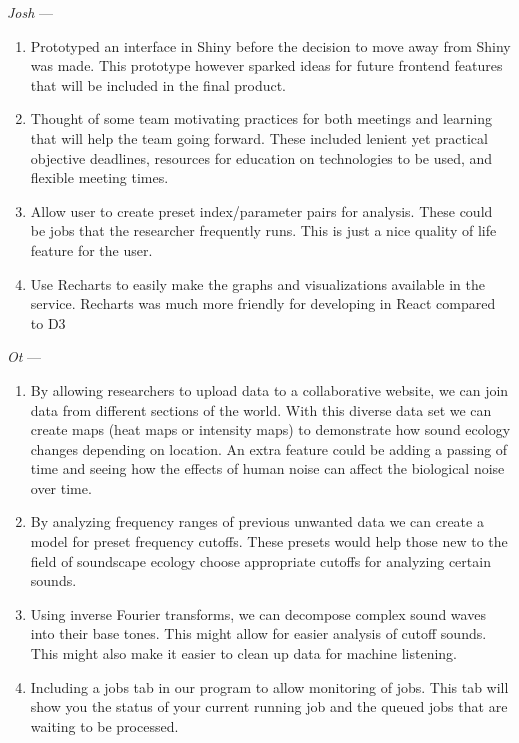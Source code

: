 \textit{Josh} ---
\begin{enumerate}
    \item Prototyped an interface in Shiny before the decision to move away from Shiny was made. This prototype however sparked ideas for future frontend features that will be included in the final product.
    \item Thought of some team motivating practices for both meetings and learning that will help the team going forward. These included lenient yet practical objective deadlines, resources for education on technologies to be used, and flexible meeting times.
    \item Allow user to create preset index/parameter pairs for analysis. These could be jobs that the researcher frequently runs. This is just a nice quality of life feature for the user.
    \item Use Recharts to easily make the graphs and visualizations available in the service. Recharts was much more friendly for developing in React compared to D3
\end{enumerate}

\textit{Ot} ---
\begin{enumerate}
    \item By allowing researchers to upload data to a collaborative website, we can join data from different sections of the world. With this diverse data set we can create maps (heat maps or intensity maps) to demonstrate how sound ecology changes depending on location. An extra feature could be adding a passing of time and seeing how the effects of human noise can affect the biological noise over time.
    \item By analyzing frequency ranges of previous unwanted data we can create a model for preset frequency cutoffs. These presets would help those new to the field of soundscape ecology choose appropriate cutoffs for analyzing certain sounds.
    \item Using inverse Fourier transforms, we can decompose complex sound waves into their base tones. This might allow for easier analysis of cutoff sounds. This might also make it easier to clean up data for machine listening.
    \item Including a jobs tab in our program to allow monitoring of jobs. This tab will show you the status of your current running job and the queued jobs that are waiting to be processed.
\end{enumerate}
